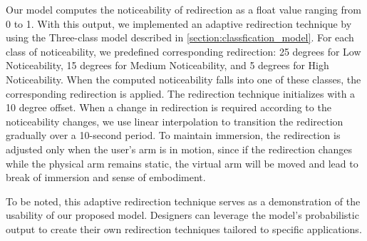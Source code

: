 Our model computes the noticeability of redirection as a float value ranging from 0 to 1. 
With this output, we implemented an adaptive redirection technique by using the Three-class model described in \autoref{section:classfication_model}.
For each class of noticeability, we predefined corresponding redirection: 25 degrees for Low Noticeability, 15 degrees for Medium Noticeability, and 5 degrees for High Noticeability. 
When the computed noticeability falls into one of these classes, the corresponding redirection is applied.
The redirection technique initializes with a 10 degree offset. 
When a change in redirection is required according to the noticeability changes, we use linear interpolation to transition the redirection gradually over a 10-second period. 
To maintain immersion, the redirection is adjusted only when the user’s arm is in motion, since if the redirection changes while the physical arm remains static, the virtual arm will be moved and lead to break of immersion and sense of embodiment.

To be noted, this adaptive redirection technique serves as a demonstration of the usability of our proposed model. 
Designers can leverage the model's probabilistic output to create their own redirection techniques tailored to specific applications.


